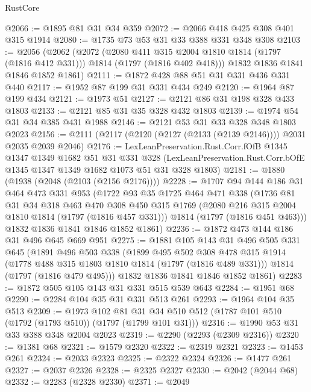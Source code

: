 \begin{lexlean}{RustCore}
\begin{coremodule}
@2066 := @1895 @81 @31 @34 @359
@2072 := @2066 @418 @425 @308 @401 @315 @1914
@2080 := @1735 @73 @53 @31 @33 @388 @331 @348 @308
@2103 := @2056
    (@2062
      (@2072
        (@2080 @411 @315 @2004 @1810 @1814 (@1797 (@1816 @412 @331)))
        @1814
        (@1797 (@1816 @402 @418)))
      @1832
      @1836
      @1841
      @1846
      @1852
      @1861)
@2111 := @1872 @428 @88 @51 @31 @331 @436 @331 @440
@2117 := @1952 @87 @199 @31 @331 @434 @249
@2120 := @1964 @87 @199 @434
@2121 := @1973 @51
@2127 := @2121 @86 @31 @198 @328 @433 @1803
@2133 := @2121 @85 @31 @35 @328 @432 @1803
@2139 := @1974 @54 @31 @34 @385 @431 @1988
@2146 := @2121 @53 @31 @33 @328 @348 @1803 @2023
@2156 := @2111 (@2117 (@2120 (@2127 (@2133 (@2139 @2146)))) @2031 @2035 @2039 @2046)
@2176 := LexLeanPreservation.Rust.Corr.fOfB
    @1345
    @1347
    @1349
    @1682
    @51
    @31
    @331
    @328
    (LexLeanPreservation.Rust.Corr.bOfE @1345 @1347 @1349 @1682 @1073 @51 @31 @328 @1803)
@2181 := @1880 (@1938 (@2048 (@2103 (@2156 @2176))))
@2228 := @1707
    @94
    @144
    @186
    @31
    @464
    @473
    @331
    @953
    (@1722
      @93
      @35
      @1725
      @464
      @471
      @338
      (@1736
        @81
        @31
        @34
        @318
        @463
        @470
        @308
        @450
        @315
        @1769
        (@2080 @216 @315 @2004 @1810 @1814 (@1797 (@1816 @457 @331)))
        @1814
        (@1797 (@1816 @451 @463)))
      @1832
      @1836
      @1841
      @1846
      @1852
      @1861)
@2236 := @1872 @473 @144 @186 @31 @496 @645 @669 @951
@2275 := @1881
    @105
    @143
    @31
    @496
    @505
    @331
    @645
    (@1891
      @496
      @503
      @338
      (@1899
        @495
        @502
        @308
        @478
        @315
        @1914
        (@1778 @488 @315 @1803 @1810 @1814 (@1797 (@1816 @489 @331)))
        @1814
        (@1797 (@1816 @479 @495)))
      @1832
      @1836
      @1841
      @1846
      @1852
      @1861)
@2283 := @1872 @505 @105 @143 @31 @331 @515 @539 @643
@2284 := @1951 @68
@2290 := @2284 @104 @35 @31 @331 @513 @261
@2293 := @1964 @104 @35 @513
@2309 := @1973
    @102
    @81
    @31
    @34
    @510
    @512
    (@1787 @101 @510 (@1792 (@1793 @510)) (@1797 (@1799 @101 @31)))
@2316 := @1990 @53 @31 @33 @388 @348 @2004 @2023
@2319 := @2290 (@2293 (@2309 @2316))
@2320 := @1381 @68
@2321 := @1579 @2320
@2322 := @2319 @2321
@2323 := @1453 @261
@2324 := @2033 @2323
@2325 := @2322 @2324
@2326 := @1477 @261
@2327 := @2037 @2326
@2328 := @2325 @2327
@2330 := @2042 (@2044 @68)
@2332 := @2283 (@2328 @2330)
@2371 := @2049

\end{coremodule}
\end{lexlean}
